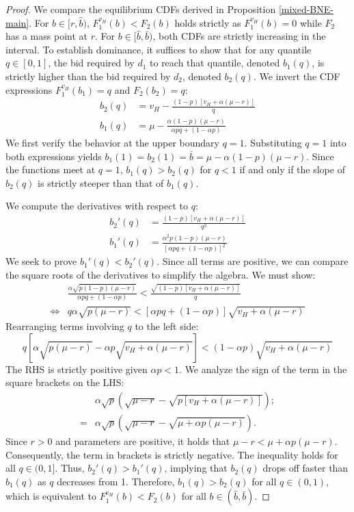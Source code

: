 \begin{proof}
We compare the equilibrium CDFs derived in Proposition \ref{mixed-BNE-main}. For $b \in [r, \hat{b})$, $F_1^{v_H}(b) < F_2(b)$ holds strictly as $F_1^{v_H}(b) = 0$ while $F_2$ has a mass point at $r$. For $b \in [\hat{b}, \bar{b})$, both CDFs are strictly increasing in the interval. To establish dominance, it suffices to show that for any quantile $q \in [0, 1]$, the bid required by $d_1$ to reach that quantile, denoted $b_1(q)$, is strictly higher than the bid required by $d_2$, denoted $b_2(q)$. We invert the CDF expressions $F_1^{v_H}(b_1) = q$ and $F_2(b_2) = q$:
\begin{align*}
    b_2(q) &= v_H - \frac{(1-p)[v_H+\alpha(\mu-r)]}{q} \\[5pt]
    b_1(q) &= \mu - \frac{\alpha(1-p)(\mu-r)}{\alpha p q + (1-\alpha p)}
\end{align*}
We first verify the behavior at the upper boundary $q=1$. Substituting $q=1$ into both expressions yields $b_1(1) = b_2(1) = \bar{b} = \mu - \alpha(1-p)(\mu-r)$. Since the functions meet at $q=1$, $b_1(q) > b_2(q)$ for $q < 1$ if and only if the slope of $b_2(q)$ is strictly steeper than that of $b_1(q)$.

\noindent We compute the derivatives with respect to $q$:
\begin{align*}
    b_2'(q) &= \frac{(1-p)[v_H+\alpha(\mu-r)]}{q^2} \\[5pt]
    b_1'(q) &= \frac{\alpha^2 p (1-p)(\mu-r)}{[\alpha p q + (1-\alpha p)]^2}
\end{align*}
We seek to prove $b_1'(q) < b_2'(q)$. Since all terms are positive, we can compare the square roots of the derivatives to simplify the algebra. We must show:
\begin{align*}
    & \frac{\alpha \sqrt{p(1-p)(\mu-r)}}{\alpha p q + (1-\alpha p)} < \frac{\sqrt{(1-p)[v_H+\alpha(\mu-r)]}}{q} \\[5pt]
    \iff & q \alpha \sqrt{p(\mu-r)} < [\alpha p q + (1-\alpha p)] \sqrt{v_H+\alpha(\mu-r)}
\end{align*}
Rearranging terms involving $q$ to the left side:
\begin{equation*}
    q \left[ \alpha\sqrt{p(\mu-r)} - \alpha p \sqrt{v_H+\alpha(\mu-r)} \right] < (1-\alpha p)\sqrt{v_H+\alpha(\mu-r)}
\end{equation*}
The RHS is strictly positive given $\alpha p < 1$. We analyze the sign of the term in the square brackets on the LHS:
\begin{align*}
    &\alpha\sqrt{p} \left( \sqrt{\mu-r} - \sqrt{p[v_H+\alpha(\mu-r)]} \right); \\[5pt]
    = & \alpha\sqrt{p} \left( \sqrt{\mu-r} - \sqrt{\mu+\alpha p(\mu-r)} \right).
\end{align*}
Since $r > 0$ and parameters are positive, it holds that $\mu-r < \mu + \alpha p(\mu-r)$. Consequently, the term in brackets is strictly negative. The inequality holds for all $q \in (0, 1]$. Thus, $b_2'(q) > b_1'(q)$, implying that $b_2(q)$ drops off faster than $b_1(q)$ as $q$ decreases from 1. Therefore, $b_1(q) > b_2(q)$ for all $q \in (0, 1)$, which is equivalent to $F_1^{v_H}(b) < F_2(b)$ for all $b \in (\hat{b}, \bar{b})$.
\end{proof}

